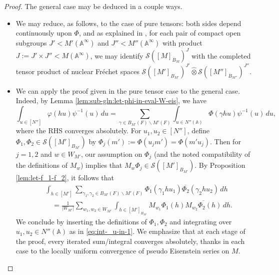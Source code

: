 \begin{proof}
  The general case may be deduced in a couple ways.
  \begin{itemize}
  \item We may reduce, as follows, to the case of pure tensors: both sides depend continuously upon $\Phi$, and as explained in \cite[\S2.5.9]{MR4426741}, for each pair of compact open subgroups $J' < M'(\mathbb{A}^\infty)$ and $J'' < M''(\mathbb{A}^\infty)$ with product $J := J' \times J'' < M(\mathbb{A}^\infty)$, we may identify $\mathcal{S}([M]_{B_M})^J$ with the completed tensor product of nuclear Fr{\'e}chet spaces $\mathcal{S}([M']_{B_{M'}})^{J'} \hat{\otimes} \mathcal{S}([M'']_{B_{M''}})^{J''}$.
  \item We can apply the proof given in the pure tensor case to the general case.  Indeed, by Lemma \ref{lem:sub-gln:let-phi-in-eval-W-eis}, we have
    \begin{equation}\label{eq:int-_u-in-1}
      \int_{u \in [N'']} \varphi(h u) \psi^{-1}(u) \, d u
      =
      \sum_{\gamma \in B_{M'}(F) \backslash M'(F)}
      \int_{u \in N''(\mathbb{A})}
      \Phi(\gamma h u)
      \psi^{-1}(u) \,  d u,
    \end{equation}
    where the RHS converges absolutely.  For $u_1, u_2 \in [N'']$, define $\Phi_1, \Phi_2 \in \mathcal{S}([M']_{B_{M'}})$ by $\Phi_j(m') := \Phi(u_j m') = \Phi(m' u_j)$.  Then for $j =1,2$ and $w \in W_{M'}$, our assumption on $\Phi_j$ (and the noted compatibility of the definitions of $M_w$) implies that $M_w \Phi_j \in \mathcal{S}([M']_{B_{M'}})$.  By Proposition \ref{lem:let-f_1-f_2}, it follows that
    \begin{align*}
      &\int_{h \in [M']}
        \sum_{\gamma_1, \gamma_2 \in B_{M'}(F) \backslash M'(F)}
        \Phi_1(\gamma_1 h u_1)
        \overline{\Phi_2}(\gamma_2 h u_2) \, d h \\
      &\quad =
        \frac{1}{|W_{M'}|}
        \sum_{w_1, w_2 \in W_{M'}}
        \int_{h \in [M']_{B_{M'}}}
        M_{w_1} \Phi_1(h)
        \overline{M_{w_2} \Phi_2(h)} \, d h.
    \end{align*}
    We conclude by inserting the definitions of $\Phi_1, \Phi_2$ and integrating over $u_1, u_2 \in N''(\mathbb{A})$ as in \eqref{eq:int-_u-in-1}.  We emphasize that at each stage of the proof, every iterated sum/integral converges absolutely, thanks in each case to the locally uniform convergence of pseudo Eisenstein series on $M$.
  \end{itemize}

\end{proof}
